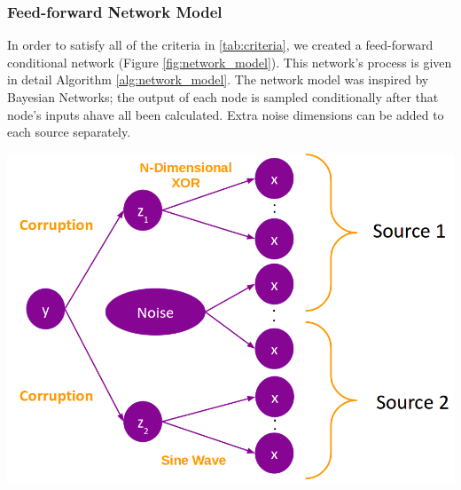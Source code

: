 \documentclass{article}
\begin{document}
\subsubsection*{Feed-forward Network Model}

In order to satisfy all of the criteria in \ref{tab:criteria}, we created a
feed-forward conditional network (Figure \ref{fig:network_model}). This
network's process is given in detail Algorithm \ref{alg:network_model}. The
network model was inspired by Bayesian Networks; the output of each node is
sampled conditionally after that node's inputs ahave all been calculated. Extra
noise dimensions can be added to each source separately.

\begin{minipage}{\textwidth}
    \centering
    \includegraphics[scale=0.4]{network_model.png}
    \label{fig:network_model}
\end{minipage}
\end{document}
